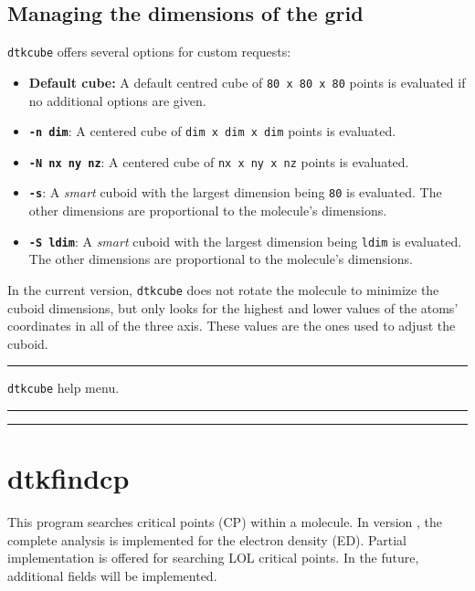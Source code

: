 \subsection{Managing the dimensions of the grid}

\texttt{dtkcube} offers several options for custom requests:
\begin{itemize}
   \item \textbf{Default cube: } A default centred cube of \texttt{80 x 80 x 80} points is evaluated if no additional options are given.
  	\item\texttt{\textbf{-n dim}}: A centered cube of \texttt{dim x dim x dim} points is evaluated.
	\item\texttt{\textbf{-N nx ny nz}}: A centered cube of \texttt{nx x ny x nz} points is evaluated.
	\item\texttt{\textbf{-s}}: A \textit{smart} cuboid with the largest dimension being \texttt{80} is evaluated. The other dimensions are proportional to the molecule's dimensions.
	\item\texttt{\textbf{-S ldim}}: A \textit{smart} cuboid with the largest dimension being \texttt{ldim} is evaluated. The other dimensions are proportional to the molecule's dimensions.
\end{itemize}

In the current version, \texttt{dtkcube} does not rotate the molecule to minimize the cuboid dimensions, but only looks for the highest and lower values of the atoms' coordinates in all of the three axis. These values are the ones used to adjust the cuboid.

\rule{\textwidth}{1pt}
{\center\texttt{dtkcube} help menu.\\}
\rule{\textwidth}{1pt}
\begin{footnotesize}
\end{footnotesize}
\rule{\textwidth}{1pt}
\section{dtkfindcp}\label{sec:dtkfindcp}

This program searches critical points (CP) within a molecule. In version \dtkversion, the complete analysis is implemented for the electron density (ED). Partial implementation is offered for searching LOL critical points. In the future, additional fields will be implemented.

